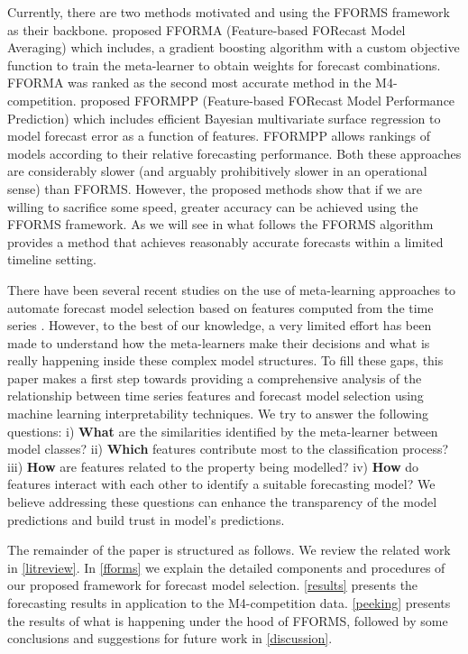 \documentclass[11pt,a4paper,]{article}
\begin{document}
Currently, there are two methods motivated and using the FFORMS framework as their backbone. \textcite{MonManEtAl2020} proposed FFORMA (Feature-based FORecast Model Averaging) which includes, a gradient boosting algorithm with a custom objective function to train the meta-learner to obtain weights for forecast combinations. FFORMA was ranked as the second most accurate method in the M4-competition. \textcite{TalEtAl2022} proposed FFORMPP (Feature-based FORecast Model Performance Prediction) which includes efficient Bayesian multivariate surface regression to model forecast error as a function of features. FFORMPP allows rankings of models according to their relative forecasting performance. Both these approaches are considerably slower (and arguably prohibitively slower in an operational sense) than FFORMS. However, the proposed methods show that if we are willing to sacrifice some speed, greater accuracy can be achieved using the FFORMS framework. As we will see in what follows the FFORMS algorithm provides a method that achieves reasonably accurate forecasts within a limited timeline setting.

There have been several recent studies on the use of meta-learning approaches to automate forecast model selection based on features computed from the time series \autocite{shah1997model,prudencio2004meta,lemke2010meta,kuck2016meta}. However, to the best of our knowledge, a very limited effort has been made to understand how the meta-learners make their decisions and what is really happening inside these complex model structures. To fill these gaps, this paper makes a first step towards providing a comprehensive analysis of the relationship between time series features and forecast model selection using machine learning interpretability techniques. We try to answer the following questions:
i) \textbf{What} are the similarities identified by the meta-learner between model classes?
ii) \textbf{Which} features contribute most to the classification process?
iii) \textbf{How} are features related to the property being modelled?
iv) \textbf{How} do features interact with each other to identify a suitable forecasting model? We believe addressing these questions can enhance the transparency of the model predictions and build trust in model's predictions.

The remainder of the paper is structured as follows. We review the related work in \autoref{litreview}. In \autoref{fforms} we explain the detailed components and procedures of our proposed framework for forecast model selection. \autoref{results} presents the forecasting results in application to the M4-competition data. \autoref{peeking} presents the results of what is happening under the hood of FFORMS, followed by some conclusions and suggestions for future work in \autoref{discussion}.
\end{document}
